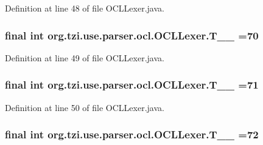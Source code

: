 Definition at line 48 of file O\-C\-L\-Lexer.\-java.

\hypertarget{classorg_1_1tzi_1_1use_1_1parser_1_1ocl_1_1_o_c_l_lexer_ac7aed124dbe939d5bd2e514e0299716f}{
\subsubsection[{T\-\_\-\-\_\-70}]{\setlength{\rightskip}{0pt plus 5cm}final int org.\-tzi.\-use.\-parser.\-ocl.\-O\-C\-L\-Lexer.\-T\-\_\-\-\_ =70\hspace{0.3cm}{\ttfamily [static]}}}\label{classorg_1_1tzi_1_1use_1_1parser_1_1ocl_1_1_o_c_l_lexer_ac7aed124dbe939d5bd2e514e0299716f}


Definition at line 49 of file O\-C\-L\-Lexer.\-java.

\hypertarget{classorg_1_1tzi_1_1use_1_1parser_1_1ocl_1_1_o_c_l_lexer_abb437907b1e1082f10ccd3aa2427f770}{
\subsubsection[{T\-\_\-\-\_\-71}]{\setlength{\rightskip}{0pt plus 5cm}final int org.\-tzi.\-use.\-parser.\-ocl.\-O\-C\-L\-Lexer.\-T\-\_\-\-\_ =71\hspace{0.3cm}{\ttfamily [static]}}}\label{classorg_1_1tzi_1_1use_1_1parser_1_1ocl_1_1_o_c_l_lexer_abb437907b1e1082f10ccd3aa2427f770}


Definition at line 50 of file O\-C\-L\-Lexer.\-java.

\hypertarget{classorg_1_1tzi_1_1use_1_1parser_1_1ocl_1_1_o_c_l_lexer_a79f094bfcd5ff2d2487522492c548295}{
\subsubsection[{T\-\_\-\-\_\-72}]{\setlength{\rightskip}{0pt plus 5cm}final int org.\-tzi.\-use.\-parser.\-ocl.\-O\-C\-L\-Lexer.\-T\-\_\-\-\_ =72\hspace{0.3cm}{\ttfamily [static]}}}\label{classorg_1_1tzi_1_1use_1_1parser_1_1ocl_1_1_o_c_l_lexer_a79f094bfcd5ff2d2487522492c548295}


